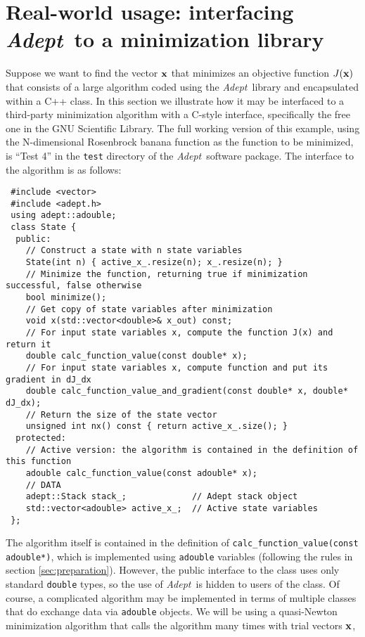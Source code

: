 \documentclass[a4,oneside]{book}
\def\codesize{\small}
\def\x{\ensuremath{{\bf x}}}
\def\Adept{\emph{Adept}}
\def\code#1{{\codesize\texttt{#1}}}
\begin{document}
\section{Real-world usage: interfacing \Adept\ to a minimization library}
\label{sec:realworld}
Suppose we want to find the vector $\x$ that minimizes an objective function
$J(\x)$ that consists of a large algorithm coded using the
\Adept\ library and encapsulated within a C++ class.  In this section
we illustrate how it may be interfaced to a third-party minimization
algorithm with a C-style interface, specifically the free one in the
GNU Scientific Library.  The full working version of this example,
using the N-dimensional Rosenbrock banana function as the function to
be minimized, is ``Test 4'' in the \code{test} directory of the
\Adept\ software package. The interface to the algorithm is as
follows:
%
\begin{lstlisting}
 #include <vector>
 #include <adept.h>
 using adept::adouble;
 class State {
  public:
    // Construct a state with n state variables
    State(int n) { active_x_.resize(n); x_.resize(n); }
    // Minimize the function, returning true if minimization successful, false otherwise
    bool minimize();
    // Get copy of state variables after minimization
    void x(std::vector<double>& x_out) const;
    // For input state variables x, compute the function J(x) and return it
    double calc_function_value(const double* x);
    // For input state variables x, compute function and put its gradient in dJ_dx
    double calc_function_value_and_gradient(const double* x, double* dJ_dx);
    // Return the size of the state vector
    unsigned int nx() const { return active_x_.size(); }
  protected:
    // Active version: the algorithm is contained in the definition of this function
    adouble calc_function_value(const adouble* x);
    // DATA
    adept::Stack stack_;             // Adept stack object
    std::vector<adouble> active_x_;  // Active state variables
 };
\end{lstlisting}
%
The algorithm itself is contained in the definition of
\code{calc\_function\_value(const adouble*)}, which is implemented using
\code{adouble} variables (following the rules in section
\ref{sec:preparation}). However, the public interface to the class
uses only standard \code{double} types, so the use of \Adept\ is
hidden to users of the class.  Of course, a complicated algorithm may
be implemented in terms of multiple classes that do exchange data via
\code{adouble} objects. We will be using a quasi-Newton minimization
algorithm that calls the algorithm many times with trial vectors $\x$,
\end{document}
